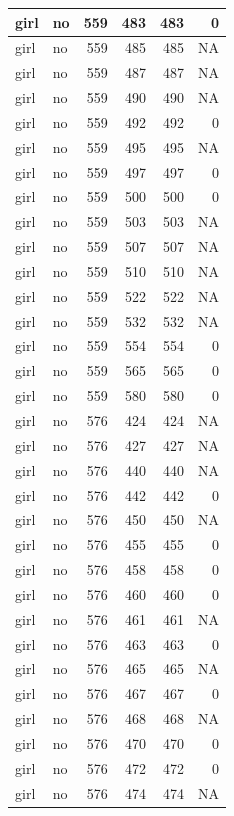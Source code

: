 \documentclass[man]{apa6}
\begin{document}
\begin{tabular}{l|l|r|r|r|r}
\hline
girl & no & 559 & 483 & 483 & 0\\
\hline
girl & no & 559 & 485 & 485 & NA\\
\hline
girl & no & 559 & 487 & 487 & NA\\
\hline
girl & no & 559 & 490 & 490 & NA\\
\hline
girl & no & 559 & 492 & 492 & 0\\
\hline
girl & no & 559 & 495 & 495 & NA\\
\hline
girl & no & 559 & 497 & 497 & 0\\
\hline
girl & no & 559 & 500 & 500 & 0\\
\hline
girl & no & 559 & 503 & 503 & NA\\
\hline
girl & no & 559 & 507 & 507 & NA\\
\hline
girl & no & 559 & 510 & 510 & NA\\
\hline
girl & no & 559 & 522 & 522 & NA\\
\hline
girl & no & 559 & 532 & 532 & NA\\
\hline
girl & no & 559 & 554 & 554 & 0\\
\hline
girl & no & 559 & 565 & 565 & 0\\
\hline
girl & no & 559 & 580 & 580 & 0\\
\hline
girl & no & 576 & 424 & 424 & NA\\
\hline
girl & no & 576 & 427 & 427 & NA\\
\hline
girl & no & 576 & 440 & 440 & NA\\
\hline
girl & no & 576 & 442 & 442 & 0\\
\hline
girl & no & 576 & 450 & 450 & NA\\
\hline
girl & no & 576 & 455 & 455 & 0\\
\hline
girl & no & 576 & 458 & 458 & 0\\
\hline
girl & no & 576 & 460 & 460 & 0\\
\hline
girl & no & 576 & 461 & 461 & NA\\
\hline
girl & no & 576 & 463 & 463 & 0\\
\hline
girl & no & 576 & 465 & 465 & NA\\
\hline
girl & no & 576 & 467 & 467 & 0\\
\hline
girl & no & 576 & 468 & 468 & NA\\
\hline
girl & no & 576 & 470 & 470 & 0\\
\hline
girl & no & 576 & 472 & 472 & 0\\
\hline
girl & no & 576 & 474 & 474 & NA\\

\end{tabular}
\end{document}
